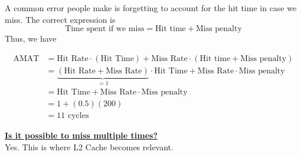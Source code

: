 \documentclass[11pt]{article}
\begin{document}
A common error people make is forgetting to account for the hit time in case we miss. The correct expression is $$\text{Time spent if we miss} = \text{Hit time} + \text{Miss penalty} $$ Thus, we have 

\begin{align*}
  \text{AMAT} &= \text{Hit Rate} \cdot \left(\text{Hit Time}\right) + \text{Miss Rate} \cdot \left(\text{Hit time} + \text{Miss penalty}\right) \\
  &= \underbrace{\left( \text{Hit Rate} + \text{Miss Rate} \right)}_{=1} \cdot \text{Hit Time} + \text{Miss Rate} \cdot \text{Miss penalty} \\
  &= \text{Hit Time} + \text{Miss Rate} \cdot \text{Miss penalty} \\
  &= 1 + (0.5)(200) \\
  &= 11 \text{ cycles}
\end{align*}

\begin{bluebox}
  \textbf{\underline{Is it possible to miss multiple times?}} \\
  Yes. This is where L2 Cache becomes relevant.
\end{bluebox}










\end{document}
